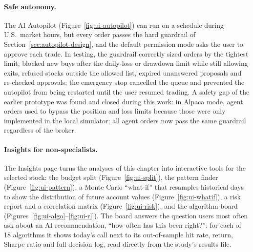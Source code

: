\paragraph{Safe autonomy.} The AI Autopilot (Figure~\ref{fig:ui-autopilot}) can run on a schedule during U.S.\ market hours, but every order passes the hard guardrail of Section~\ref{sec:autopilot-design}, and the default permission mode asks the user to approve each trade. In testing, the guardrail correctly sized orders by the tightest limit, blocked new buys after the daily-loss or drawdown limit while still allowing exits, refused stocks outside the allowed list, expired unanswered proposals and re-checked approvals; the emergency stop cancelled the queue and prevented the autopilot from being restarted until the user resumed trading. A safety gap of the earlier prototype was found and closed during this work: in Alpaca mode, agent orders used to bypass the position and loss limits because those were only implemented in the local simulator; all agent orders now pass the same guardrail regardless of the broker.
\paragraph{Insights for non-specialists.} The Insights page turns the analyses of this chapter into interactive tools for the selected stock: the budget split (Figure~\ref{fig:ui-split}), the pattern finder (Figure~\ref{fig:ui-pattern}), a Monte Carlo ``what-if'' that resamples historical days to show the distribution of future account values (Figure~\ref{fig:ui-whatif}), a risk report and a correlation matrix (Figure~\ref{fig:ui-risk}), and the algorithm board (Figures~\ref{fig:ui-algo}--\ref{fig:ui-rl}). The board answers the question users most often ask about an AI recommendation, ``how often has this been right?'': for each of 18 algorithms it shows today's call next to its out-of-sample hit rate, return, Sharpe ratio and full decision log, read directly from the study's results file.

